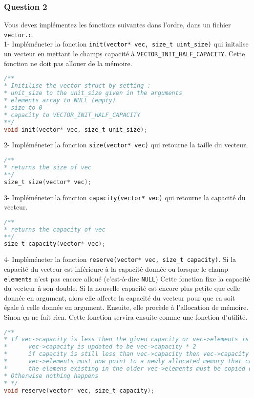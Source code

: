 \documentclass[a4paper]{article}
\begin{document}
	\subsubsection*{Question 2}
	Vous devez implémentez les fonctions suivantes dans l'ordre, dans un fichier \texttt{vector.c}.\\
	
	1- Impléméneter la fonction \texttt{init(vector* vec, size\_t uint\_size)} qui initalise un vecteur en mettant le champs capacité à \texttt{VECTOR\_INIT\_HALF\_CAPACITY}. Cette fonction ne doit pas allouer de la mémoire.
	\begin{lstlisting}[language=C]
/**
* Initilise the vector struct by setting :
* unit_size to the unit_size given in the arguments
* elements array to NULL (empty)
* size to 0
* capacity to VECTOR_INIT_HALF_CAPACITY
**/
void init(vector* vec, size_t unit_size);
	\end{lstlisting}

	2- Impléméneter la fonction \texttt{size(vector* vec)} qui retourne la taille du vecteur.
\begin{lstlisting}[language=C]
/**
* returns the size of vec
**/
size_t size(vector* vec);
\end{lstlisting}

	3- Impléméneter la fonction \texttt{capacity(vector* vec)} qui retourne la capacité du vecteur.
	\begin{lstlisting}[language=C]
/**
* returns the capacity of vec
**/
size_t capacity(vector* vec);
	\end{lstlisting}

	4- Impléméneter la fonction \texttt{reserve(vector* vec, size\_t capacity)}. Si la capacité du vecteur est inférieure à la capacité donnée ou lorsque le champ \texttt{elements} n'est pas encore alloué (c'est-à-dire \texttt{NULL}) Cette fonction fixe la capacité du vecteur à son double. Si la nouvelle capacité est encore plus petite que celle donnée en argument, alors elle affecte la capacité du vecteur pour que ca soit égale à celle donnée en argument. Ensuite, elle procède à l'allocation de mémoire. Sinon ça ne fait rien. 
	Cette fonction servira ensuite comme une fonction d'utilité.
\begin{lstlisting}[language=C]
/**
* If vec->capacity is less then the given capacity or vec->elements is NULL then
*      vec->capacity is updated to be vec->capacity * 2
*      if capacity is still less than vec->capacity then vec->capacity must be capacity
*      vec->elements must now point to a newly allocated memory that can contain vec->capacity elements
*      the elemens existing in the older vec->elements must be copied over to the new vec->elements
* Otherwise nothing happens
* */
void reserve(vector* vec, size_t capacity);
\end{lstlisting}
\end{document}
